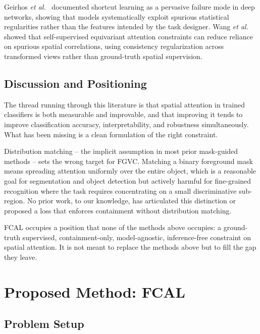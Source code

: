\documentclass[journal]{IEEEtran}
\begin{document}
Geirhos \emph{et al.}~\cite{geirhos2020shortcut} documented
shortcut learning as a pervasive failure mode in deep networks,
showing that models systematically exploit spurious statistical
regularities rather than the features intended by the task
designer. Wang \emph{et al.}~\cite{wang2020self} showed that
self-supervised equivariant attention constraints can reduce
reliance on spurious spatial correlations, using consistency
regularization across transformed views rather than ground-truth
spatial supervision.

\subsection{Discussion and Positioning}

The thread running through this literature is that spatial
attention in trained classifiers is both measurable and
improvable, and that improving it tends to improve classification
accuracy, interpretability, and robustness simultaneously. What
has been missing is a clean formulation of the right constraint.

Distribution matching -- the implicit assumption in most prior
mask-guided methods -- sets the wrong target for FGVC. Matching a
binary foreground mask means spreading attention uniformly over
the entire object, which is a reasonable goal for segmentation
and object detection but actively harmful for fine-grained
recognition where the task requires concentrating on a small
discriminative sub-region. No prior work, to our knowledge,
has articulated this distinction or proposed a loss that enforces
containment without distribution matching.

FCAL occupies a position that none of the methods above occupies:
a ground-truth supervised, containment-only, model-agnostic,
inference-free constraint on spatial attention. It is not meant
to replace the methods above but to fill the gap they leave.


\section{Proposed Method: FCAL}
\label{sec:method}

\subsection{Problem Setup}
\end{document}
